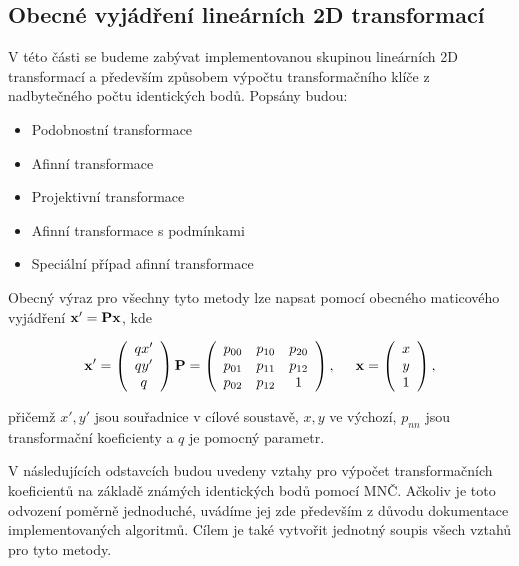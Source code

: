 \subsection{Obecné vyjádření lineárních 2D transformací}

V této části se budeme zabývat implementovanou skupinou lineárních 2D
transformací a především způsobem výpočtu transformačního klíče z nadbytečného počtu
identických bodů. Popsány budou:

\begin{itemize}
  \item Podobnostní transformace
  \item Afinní transformace
  \item Projektivní transformace
  \item Afinní transformace s podmínkami
  \item Speciální případ afinní transformace
\end{itemize}

Obecný výraz pro všechny tyto metody lze napsat pomocí obecného maticového
vyjádření $\bf x' = P x$, kde

$$ {\bf x'} = \left(
\begin{array}{ccc}
qx'\\
qy'\\ 
q\\
\end{array}
\right) 
{\bf P} = \left(
\begin{array}{ccc}
p_{00}  &   p_{10}  &   p_{20}  \\
p_{01}  &   p_{11}  &   p_{12} \\
p_{02} &    p_{12}  &    1                                
\end{array}
 \right),
  \hspace{0.5 cm} 
 {\bf x} = 
 \left(
\begin{array}{ccc}
x\\
y\\ 
1\\
\end{array}
\right) ,
$$ 

přičemž $x', y'$ jsou souřadnice v cílové soustavě, $x, y$ ve výchozí, 
$p_{nn}$  jsou transformační koeficienty a $q$ je pomocný parametr.

V následujících odstavcích budou uvedeny vztahy pro výpočet
transformačních koeficientů na základě známých identických bodů pomocí MNČ.
Ačkoliv je toto odvození poměrně jednoduché, uvádíme jej zde především z důvodu
dokumentace implementovaných algoritmů. Cílem je také vytvořit jednotný soupis
všech vztahů pro tyto metody.

